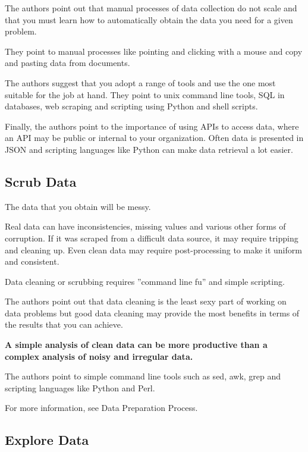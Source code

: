 \documentclass[11pt]{article}
\begin{document}
    The authors point out that manual processes of data collection do not scale and that you must learn how to automatically obtain the data you need for a given problem.

    They point to manual processes like pointing and clicking with a mouse and copy and pasting data from documents.

    The authors suggest that you adopt a range of tools and use the one most suitable for the job at hand.
    They point to unix command line tools, SQL in databases, web scraping and scripting using Python and shell scripts.

    Finally, the authors point to the importance of using APIs to access data, where an API may be public or internal to your organization.
    Often data is presented in JSON and scripting languages like Python can make data retrieval a lot easier.

    \subsection{Scrub Data} \label{subsec:scrub}

    The data that you obtain will be messy.

    Real data can have inconsistencies, missing values and various other forms of corruption.
    If it was scraped from a difficult data source, it may require tripping and cleaning up.
    Even clean data may require post-processing to make it uniform and consistent.

    Data cleaning or scrubbing requires ''command line fu'' and simple scripting.

    The authors point out that data cleaning is the least sexy part of working on data problems but good data cleaning may provide the most benefits in terms of the results that you can achieve.

    \textbf{A simple analysis of clean data can be more productive than a complex analysis of noisy and irregular data.}

    The authors point to simple command line tools such as sed, awk, grep and scripting languages like Python and Perl.

    For more information, see Data Preparation Process.

    \subsection{Explore Data} \label{subsec:explore}
\end{document}
